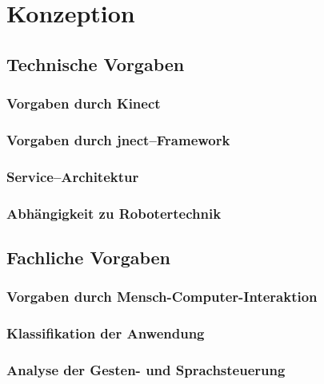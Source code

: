 \chapter{Konzeption}
\label{chap:Konzeption}

\section{Technische Vorgaben}

\subsection{Vorgaben durch Kinect}

\subsection{Vorgaben durch jnect--Framework}

\subsection{Service--Architektur}

\subsection{Abh\"angigkeit zu Robotertechnik}

\section{Fachliche Vorgaben}

\subsection{Vorgaben durch Mensch-Computer-Interaktion}

\subsection{Klassifikation der Anwendung}

\subsection{Analyse der Gesten- und Sprachsteuerung}
